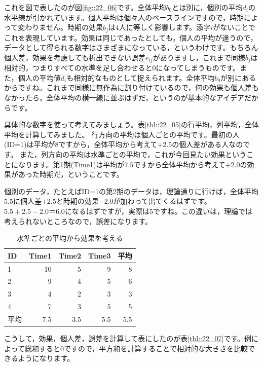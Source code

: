 \documentclass{ltjbook}
\begin{document}
これを図で表したのが図\ref{fig::22_06}です。全体平均$b_0$とは別に，個別の平均$d_i$の水平線が引かれています。個人平均は個々人のベースラインですので，時期によって変わりません。時期の効果$b_j$は4人に等しく影響します。添字$i$がないことでこれを表現しています。効果は同じであったとしても，個人の平均が違うので，データとして得られる数字はさまざまになっている，というわけです。もちろん個人差，効果を考慮しても析出できない誤差$e_{ij}$がありますし，これまで同様$b_{j}$は相対的，つまりすべての水準を足し合わせると$0$になってしまうものです。また，個人の平均値$d_i$も相対的なものとして捉えられます。全体平均$b_0$が別にあるからですね。これまで同様に無作為に割り付けているので，何の効果も個人差もなかったら，全体平均の横一線に並ぶはずだ，というのが基本的なアイデアだからです。

具体的な数字を使って考えてみましょう。表\ref{tbl::22_05}の行平均，列平均，全体平均を計算してみました。
行方向の平均は個人ごとの平均です。最初の人(ID=1)は平均が$8$ですから，全体平均から考えて$+2.5$の個人差がある人なのです。
また，列方向の平均は水準ごとの平均で，これが今回見たい効果ということになります。第1期(Time1)は平均が$7.5$ですから全体平均から考えて$+2.0$の効果があった時期だ，ということです。

個別のデータ，たとえばID=1の第2期のデータは，理論通りに行けば，全体平均$5.5$に個人差$+2.5$と時期の効果$-2.0$が加わって出てくるはずです。$5.5+2.5-2.0＝6.0$になるはずですが，実際は$5$ですね。この違いは，理論では考えられないところなので，誤差になります。
\begin{table}[ht]
	\centering
	\caption{水準ごとの平均から効果を考える}
	\begin{tabular}{lrrr|r}
		\hline
		ID & Time1 & Time2 & Time3 & 平均  \\
		\hline
		1  & 10    & 5     & 9     & 8   \\
		2  & 9     & 4     & 5     & 6   \\
		3  & 4     & 2     & 3     & 3   \\
		4  & 7     & 3     & 5     & 5   \\
		\hline
		平均 & 7.5   & 3.5   & 5.5   & 5.5 \\\hline
	\end{tabular}
	\label{tbl::22_06}
\end{table}
こうして，効果，個人差，誤差を計算して表にしたのが表\ref{tbl::22_07}です。例によって総和すると0ですので，平方和を計算することで相対的な大きさを比較できるようになります。
\end{document}
